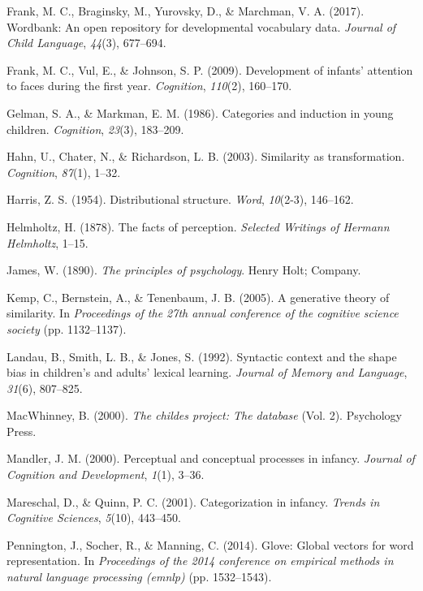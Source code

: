 \documentclass[10pt, letterpaper]{article}
\begin{document}
\hypertarget{ref-frank2017wordbank}{}
Frank, M. C., Braginsky, M., Yurovsky, D., \& Marchman, V. A. (2017).
Wordbank: An open repository for developmental vocabulary data.
\emph{Journal of Child Language}, \emph{44}(3), 677--694.

\hypertarget{ref-frank2009development}{}
Frank, M. C., Vul, E., \& Johnson, S. P. (2009). Development of infants'
attention to faces during the first year. \emph{Cognition},
\emph{110}(2), 160--170.

\hypertarget{ref-gelman1986categories}{}
Gelman, S. A., \& Markman, E. M. (1986). Categories and induction in
young children. \emph{Cognition}, \emph{23}(3), 183--209.

\hypertarget{ref-hahn2003similarity}{}
Hahn, U., Chater, N., \& Richardson, L. B. (2003). Similarity as
transformation. \emph{Cognition}, \emph{87}(1), 1--32.

\hypertarget{ref-harris1954distributional}{}
Harris, Z. S. (1954). Distributional structure. \emph{Word},
\emph{10}(2-3), 146--162.

\hypertarget{ref-helmholtz1878facts}{}
Helmholtz, H. (1878). The facts of perception. \emph{Selected Writings
of Hermann Helmholtz}, 1--15.

\hypertarget{ref-james2013principles}{}
James, W. (1890). \emph{The principles of psychology}. Henry Holt;
Company.

\hypertarget{ref-kemp2005generative}{}
Kemp, C., Bernstein, A., \& Tenenbaum, J. B. (2005). A generative theory
of similarity. In \emph{Proceedings of the 27th annual conference of the
cognitive science society} (pp. 1132--1137).

\hypertarget{ref-landau1992syntactic}{}
Landau, B., Smith, L. B., \& Jones, S. (1992). Syntactic context and the
shape bias in children's and adults' lexical learning. \emph{Journal of
Memory and Language}, \emph{31}(6), 807--825.

\hypertarget{ref-macwhinney2000childes}{}
MacWhinney, B. (2000). \emph{The childes project: The database} (Vol.
2). Psychology Press.

\hypertarget{ref-mandler2000perceptual}{}
Mandler, J. M. (2000). Perceptual and conceptual processes in infancy.
\emph{Journal of Cognition and Development}, \emph{1}(1), 3--36.

\hypertarget{ref-mareschal2001categorization}{}
Mareschal, D., \& Quinn, P. C. (2001). Categorization in infancy.
\emph{Trends in Cognitive Sciences}, \emph{5}(10), 443--450.

\hypertarget{ref-pennington2014glove}{}
Pennington, J., Socher, R., \& Manning, C. (2014). Glove: Global vectors
for word representation. In \emph{Proceedings of the 2014 conference on
empirical methods in natural language processing (emnlp)} (pp.
1532--1543).
\end{document}
